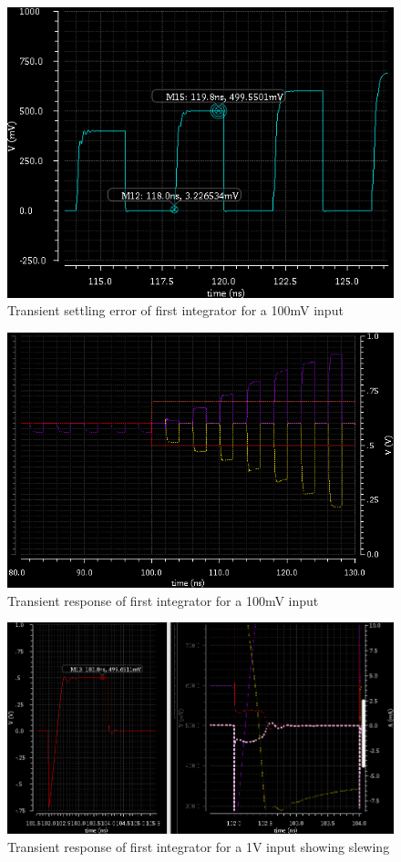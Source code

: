\documentclass[conference]{IEEEtran}
\begin{document}
\begin{figure}[h]
\centering
\includegraphics[width=\linewidth]{piktures/st2_error}
\caption{Transient settling error of first integrator for a 100mV input}
\label{stage1-tran}
\end{figure}

\begin{figure}[h]
\centering
\includegraphics[width=\linewidth]{piktures/st2_trans}
\caption{Transient response of first integrator for a 100mV input}
\label{stage1-tran}
\end{figure}

\begin{figure}[h]
\centering
\includegraphics[width=\linewidth]{piktures/st1_slew}
\caption{Transient response of first integrator for a 1V input showing slewing}
\label{stage1-tran}
\end{figure}
\end{document}
